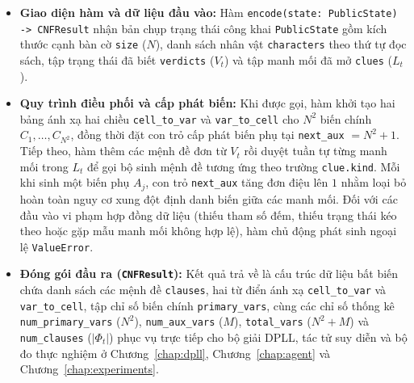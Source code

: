 \begin{itemize}
    \item \textbf{Giao diện hàm và dữ liệu đầu vào:} Hàm \texttt{encode(state: PublicState) -> CNFResult} nhận bản chụp trạng thái công khai \texttt{PublicState} gồm kích thước cạnh bàn cờ \texttt{size} ($N$), danh sách nhân vật \texttt{characters} theo thứ tự đọc sách, tập trạng thái đã biết \texttt{verdicts} ($V_t$) và tập manh mối đã mở \texttt{clues} ($L_t$).

    \item \textbf{Quy trình điều phối và cấp phát biến:} Khi được gọi, hàm khởi tạo hai bảng ánh xạ hai chiều \texttt{cell\_to\_var} và \texttt{var\_to\_cell} cho $N^2$ biến chính $C_1, \dots, C_{N^2}$, đồng thời đặt con trỏ cấp phát biến phụ tại \texttt{next\_aux} $= N^2 + 1$. Tiếp theo, hàm thêm các mệnh đề đơn từ $V_t$ rồi duyệt tuần tự từng manh mối trong $L_t$ để gọi bộ sinh mệnh đề tương ứng theo trường \texttt{clue.kind}. Mỗi khi sinh một biến phụ $A_j$, con trỏ \texttt{next\_aux} tăng đơn điệu lên $1$ nhằm loại bỏ hoàn toàn nguy cơ xung đột định danh biến giữa các manh mối. Đối với các đầu vào vi phạm hợp đồng dữ liệu (thiếu tham số đếm, thiếu trạng thái kéo theo hoặc gặp mẫu manh mối không hợp lệ), hàm chủ động phát sinh ngoại lệ \texttt{ValueError}.

    \item \textbf{Đóng gói đầu ra (\texttt{CNFResult}):} Kết quả trả về là cấu trúc dữ liệu bất biến chứa danh sách các mệnh đề \texttt{clauses}, hai từ điển ánh xạ \texttt{cell\_to\_var} và \texttt{var\_to\_cell}, tập chỉ số biến chính \texttt{primary\_vars}, cùng các chỉ số thống kê \texttt{num\_primary\_vars} ($N^2$), \texttt{num\_aux\_vars} ($M$), \texttt{total\_vars} ($N^2 + M$) và \texttt{num\_clauses} ($|\Phi_t|$) phục vụ trực tiếp cho bộ giải DPLL, tác tử suy diễn và bộ đo thực nghiệm ở Chương~\ref{chap:dpll}, Chương~\ref{chap:agent} và Chương~\ref{chap:experiments}.
\end{itemize}
